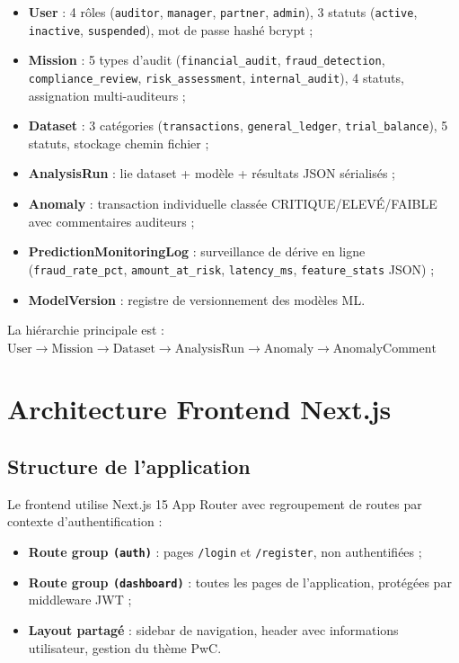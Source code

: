 \documentclass[12pt,a4paper,twoside]{report}
\theoremstyle{definition}
\begin{document}
\begin{itemize}
  \item \textbf{User} : 4 rôles (\texttt{auditor}, \texttt{manager}, \texttt{partner},
    \texttt{admin}), 3 statuts (\texttt{active}, \texttt{inactive}, \texttt{suspended}),
    mot de passe hashé bcrypt ;
  \item \textbf{Mission} : 5 types d'audit (\texttt{financial\_audit},
    \texttt{fraud\_detection}, \texttt{compliance\_review}, \texttt{risk\_assessment},
    \texttt{internal\_audit}), 4 statuts, assignation multi-auditeurs ;
  \item \textbf{Dataset} : 3 catégories (\texttt{transactions}, \texttt{general\_ledger},
    \texttt{trial\_balance}), 5 statuts, stockage chemin fichier ;
  \item \textbf{AnalysisRun} : lie dataset + modèle + résultats JSON sérialisés ;
  \item \textbf{Anomaly} : transaction individuelle classée CRITIQUE/ELEVÉ/FAIBLE
    avec commentaires auditeurs ;
  \item \textbf{PredictionMonitoringLog} : surveillance de dérive en ligne
    (\texttt{fraud\_rate\_pct}, \texttt{amount\_at\_risk}, \texttt{latency\_ms},
    \texttt{feature\_stats} JSON) ;
  \item \textbf{ModelVersion} : registre de versionnement des modèles ML.
\end{itemize}

La hiérarchie principale est :
$\text{User} \rightarrow \text{Mission} \rightarrow \text{Dataset}
\rightarrow \text{AnalysisRun} \rightarrow \text{Anomaly} \rightarrow \text{AnomalyComment}$

\section{Architecture Frontend Next.js}

\subsection{Structure de l'application}

Le frontend utilise Next.js 15 App Router avec regroupement de routes par
contexte d'authentification :

\begin{itemize}
  \item \textbf{Route group \texttt{(auth)}} : pages \texttt{/login} et
    \texttt{/register}, non authentifiées ;
  \item \textbf{Route group \texttt{(dashboard)}} : toutes les pages de
    l'application, protégées par middleware JWT ;
  \item \textbf{Layout partagé} : sidebar de navigation, header avec
    informations utilisateur, gestion du thème PwC.
\end{itemize}
\end{document}
